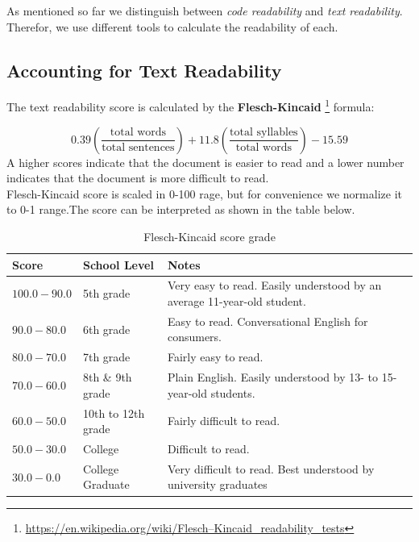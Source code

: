 \documentclass[12pt,mscthesis]{usiinfthesis}
\begin{document}
	As mentioned so far we distinguish between \emph{code readability} and \emph{text readability}. Therefor, we use different tools to calculate the readability of each. 
\newpage
\subsection{Accounting for Text Readability}
	The text readability score is calculated by the \textbf{Flesch-Kincaid} \footnote{\url{https://en.wikipedia.org/wiki/Flesch–Kincaid_readability_tests}} formula:
	

	\[0.39\left({\frac  {{\mbox{total words}}}{{\mbox{total sentences}}}}\right)+11.8\left({\frac  {{\mbox{total syllables}}}{{\mbox{total words}}}}\right)-15.59\]
	A higher scores indicate that the document is easier to read and a lower number indicates that the document is more difficult to read.\\ 
	Flesch-Kincaid score is scaled in 0-100 rage, but for convenience we normalize it to 0-1 range.The score can be interpreted as shown in the table below.
	
	\begin {table}[H]
	\begin{center}
    \begin{tabular}{| l | l | p{7cm} | }
    \hline
    \textbf{Score} & \textbf{School Level} & \textbf{Notes} \\ \hline
    $100.0-90.0$ & 5th grade & Very easy to read. Easily understood by an average 11-year-old student.\\ \hline
    $90.0-80.0$ & 6th grade & Easy to read. Conversational English for consumers.\\ \hline
 	$80.0-70.0$ & 7th grade & Fairly easy to read. \\ \hline
	$70.0-60.0$ & 8th \& 9th grade & Plain English. Easily understood by 13- to 15-year-old students.\\ \hline
	$60.0-50.0$ & 10th to 12th grade &  Fairly difficult to read.\\ \hline
	$50.0-30.0$ & College & Difficult to read.\\ \hline
	$30.0-0.0$ & College Graduate & Very difficult to read. Best understood by university graduates\\\hline

    \end{tabular}
	\end{center}
	\caption{Flesch-Kincaid score grade} \label{tab:Flesch-Kincaid} 
	\end{table}
\end{document}
